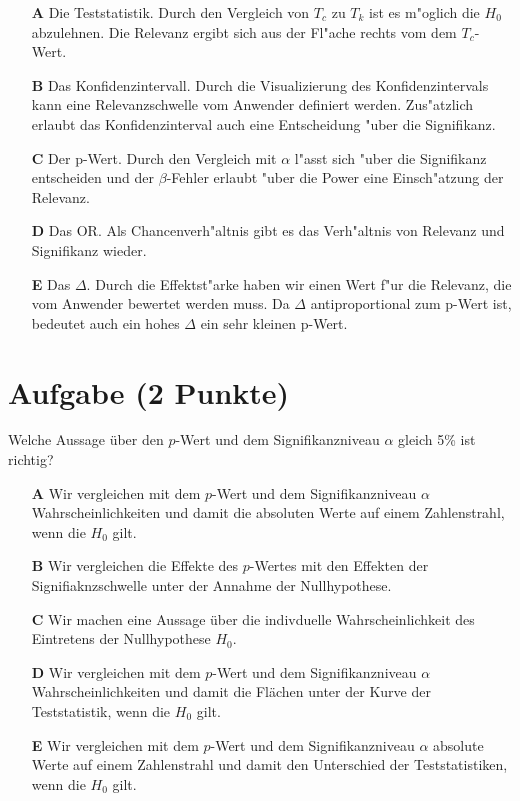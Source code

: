\documentclass[a4paper, 9pt]{scrartcl}\usepackage[]{graphicx}\usepackage[]{xcolor}
\begin{document}
\begin{enumerate}
\item [\textbf{A} \msquare] Die Teststatistik. Durch den Vergleich von $T_c$ zu $T_k$ ist es m{"o}glich die $H_0$ abzulehnen. Die Relevanz ergibt sich aus der Fl{"a}che rechts vom dem $T_c$-Wert.
\item [\textbf{B} \msquare] Das Konfidenzintervall. Durch die Visualizierung des Konfidenzintervals kann eine Relevanzschwelle vom Anwender definiert werden. Zus{"a}tzlich erlaubt das Konfidenzinterval auch eine Entscheidung {"u}ber die Signifikanz.
\item [\textbf{C} \msquare] Der p-Wert. Durch den Vergleich mit $\alpha$ l{"a}sst sich {"u}ber die Signifikanz entscheiden und der $\beta$-Fehler erlaubt {"u}ber die Power eine Einsch{"a}tzung der Relevanz.
\item [\textbf{D} \msquare] Das OR. Als Chancenverh{"a}ltnis gibt es das Verh{"a}ltnis von Relevanz und Signifikanz wieder.
\item [\textbf{E} \msquare] Das $\Delta$. Durch die Effektst{"a}rke haben wir einen Wert f{"u}r die Relevanz, die vom Anwender bewertet werden muss. Da $\Delta$ antiproportional zum p-Wert ist, bedeutet auch ein hohes $\Delta$ ein sehr kleinen p-Wert.
\end{enumerate}

\section{Aufgabe \hfill (2 Punkte)}

Welche Aussage über den $p$-Wert und dem Signifikanzniveau $\alpha$ gleich 5\% ist richtig?



\begin{enumerate}
\item [\textbf{A} \msquare] Wir vergleichen mit dem $p$-Wert und dem Signifikanzniveau $\alpha$ Wahrscheinlichkeiten und damit die absoluten Werte auf einem Zahlenstrahl, wenn die $H_0$ gilt.
\item [\textbf{B} \msquare] Wir vergleichen die Effekte des $p$-Wertes mit den Effekten der Signifiaknzschwelle unter der Annahme der Nullhypothese.
\item [\textbf{C} \msquare] Wir machen eine Aussage über die indivduelle Wahrscheinlichkeit des Eintretens der Nullhypothese $H_0$.
\item [\textbf{D} \msquare] Wir vergleichen mit dem $p$-Wert und dem Signifikanzniveau $\alpha$ Wahrscheinlichkeiten und damit die Flächen unter der Kurve der Teststatistik, wenn die $H_0$ gilt.
\item [\textbf{E} \msquare] Wir vergleichen mit dem $p$-Wert und dem Signifikanzniveau $\alpha$ absolute Werte auf einem Zahlenstrahl und damit den Unterschied der Teststatistiken, wenn die $H_0$ gilt.
\end{enumerate}
\end{document}
